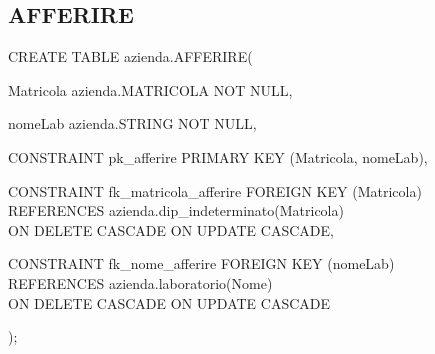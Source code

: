         \subsection{AFFERIRE}
            \ttfamily
                \begin{flushleft}
                    \begin{description}
                        \item CREATE TABLE azienda.AFFERIRE(                
                        \begin{description}
                            \item Matricola azienda.MATRICOLA NOT NULL,
                            \item nomeLab azienda.STRING NOT NULL,
                            
                            \vspace{0.5cm}

                            \item CONSTRAINT pk\_afferire PRIMARY KEY (Matricola, nomeLab),
                            \item CONSTRAINT fk\_matricola\_afferire FOREIGN KEY (Matricola)\\
                            REFERENCES azienda.dip\_indeterminato(Matricola)\\
                            ON DELETE CASCADE	ON UPDATE CASCADE,
                            \item CONSTRAINT fk\_nome\_afferire FOREIGN KEY (nomeLab)\\
                            REFERENCES azienda.laboratorio(Nome)\\
                            ON DELETE CASCADE	ON UPDATE CASCADE
                        \end{description}
                        );
                    \end{description}
                \end{flushleft}
            \normalfont

\newpage

